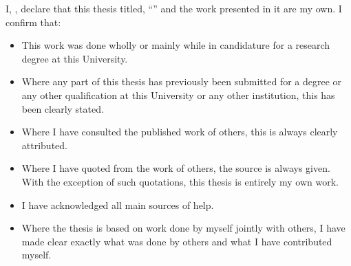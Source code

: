 \documentclass[
11pt, %
english, %
singlespacing, %
headsepline, %
]{MastersDoctoralThesis} %
\begin{document}

\begin{declaration}
\addchaptertocentry{\authorshipname} %
\noindent I, \authorname, declare that this thesis titled, \enquote{\ttitle} and the work presented in it are my own. I confirm that:

\begin{itemize} 
\item This work was done wholly or mainly while in candidature for a research degree at this University.
\item Where any part of this thesis has previously been submitted for a degree or any other qualification at this University or any other institution, this has been clearly stated.
\item Where I have consulted the published work of others, this is always clearly attributed.
\item Where I have quoted from the work of others, the source is always given. With the exception of such quotations, this thesis is entirely my own work.
\item I have acknowledged all main sources of help.
\item Where the thesis is based on work done by myself jointly with others, I have made clear exactly what was done by others and what I have contributed myself.\\
\end{itemize}
 
 
\end{declaration}


\end{document}
